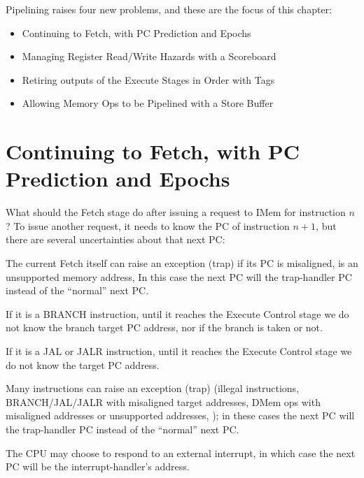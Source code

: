 Pipelining raises four new problems, and these are the focus of this
chapter:

\begin{itemize}

  \item Continuing to Fetch, with PC Prediction and Epochs

  \item Managing Register Read/Write Hazards with a Scoreboard

  \item Retiring outputs of the Execute Stages in Order with Tags

  \item Allowing Memory Ops to be Pipelined with a Store Buffer

\end{itemize}


\section{Continuing to Fetch, with PC Prediction and Epochs}

\label{Sec_Epochs}

What should the Fetch stage do after issuing a request to IMem for
instruction $n$?  To issue another request, it needs to know the PC of
instruction $n+1$, but there are several uncertainties about that next
PC:

\begin{tightlist}

 \item The current Fetch itself can raise an exception (trap) if its
        PC is misaligned, is an unsupported memory address, {\etc}
        In this case the next PC will the trap-handler PC instead of
        the ``normal'' next PC.

 \item If it is a BRANCH instruction, until it reaches the Execute
       Control stage we do not know the branch target PC address, nor
       if the branch is taken or not.

 \item If it is a JAL or JALR instruction, until it reaches the
       Execute Control stage we do not know the target PC address.

 \item Many instructions can raise an exception (trap) (illegal
       instructions, BRANCH/JAL/JALR with misaligned target addresses,
       DMem ops with misaligned addresses or unsupported addresses,
       {\etc}); in these cases the next PC will the trap-handler PC
       instead of the ``normal'' next PC.

 \item The CPU may choose to respond to an external interrupt, in
        which case the next PC will be the interrupt-handler's
        address.

\end{tightlist}

